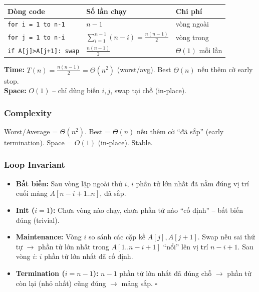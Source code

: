 \documentclass[10pt]{article}
\providecommand{\tightlist}{\setlength{\itemsep}{0pt}\setlength{\parskip}{0pt}}
\begin{document}
\begin{tcolorbox}[colback=yellow!5, colframe=orange!50, boxrule=0.5pt, arc=2pt, title={\small\textbf{Phân tích Complexity -- Bubble Sort}}]
\begin{tabular}{|l|l|l|}
\hline
\textbf{Dòng code} & \textbf{Số lần chạy} & \textbf{Chi phí} \\
\hline
\texttt{for i = 1 to n-1} & $n-1$ & vòng ngoài \\
\hline
\quad \texttt{for j = 1 to n-i} & $\sum_{i=1}^{n-1}(n-i)=\frac{n(n-1)}{2}$ & vòng trong \\
\hline
\quad\quad \texttt{if A[j]>A[j+1]: swap} & $\frac{n(n-1)}{2}$ & $\Theta(1)$ mỗi lần \\
\hline
\end{tabular}
\vspace{0.2cm}

\textbf{Time:} $T(n)=\frac{n(n-1)}{2}=\Theta(n^2)$ (worst/avg). Best $\Theta(n)$ nếu thêm cờ early stop.\\
\textbf{Space:} $O(1)$ -- chỉ dùng biến $i, j$, swap tại chỗ (in-place).
\end{tcolorbox}

\subsubsection{Complexity}
Worst/Average = $\Theta(n^2)$. Best = $\Theta(n)$ nếu thêm cờ ``đã sắp'' (early termination). Space = $O(1)$ (in-place). Stable.

\subsubsection{Loop Invariant}
\begin{itemize}
\tightlist
\item \textbf{Bất biến:} Sau vòng lặp ngoài thứ $i$, $i$ phần tử lớn nhất đã nằm đúng vị trí cuối mảng $A[n{-}i{+}1..n]$, đã sắp.
\item \textbf{Init ($i=1$):} Chưa vòng nào chạy, chưa phần tử nào ``cố định'' -- bất biến đúng (trivial).
\item \textbf{Maintenance:} Vòng $i$ so sánh các cặp kề $A[j], A[j{+}1]$. Swap nếu sai thứ tự $\to$ phần tử lớn nhất trong $A[1..n{-}i{+}1]$ ``nổi'' lên vị trí $n{-}i{+}1$. Sau vòng $i$: $i$ phần tử lớn nhất đã cố định.
\item \textbf{Termination ($i=n{-}1$):} $n{-}1$ phần tử lớn nhất đã đúng chỗ $\to$ phần tử còn lại (nhỏ nhất) cũng đúng $\to$ mảng sắp. $\square$
\end{itemize}
\end{document}
